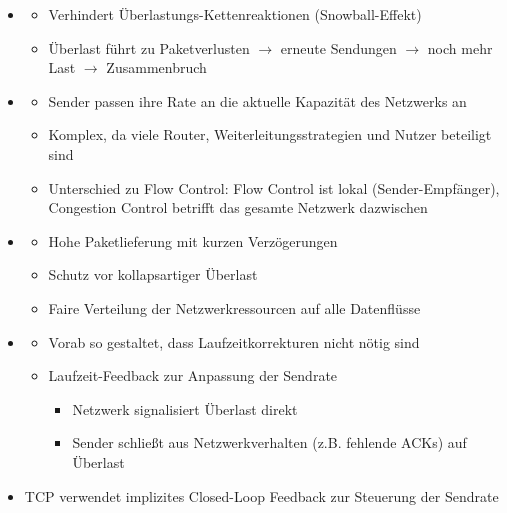 \begin{itemize}
    \item {}
    \begin{itemize}
        \item Verhindert Überlastungs-Kettenreaktionen (Snowball-Effekt)
        \item Überlast führt zu Paketverlusten $\rightarrow$ erneute Sendungen $\rightarrow$ noch mehr Last $\rightarrow$ Zusammenbruch
    \end{itemize}
    \item {}
    \begin{itemize}
        \item Sender passen ihre Rate an die aktuelle Kapazität des Netzwerks an
        \item Komplex, da viele Router, Weiterleitungsstrategien und Nutzer beteiligt sind
        \item Unterschied zu Flow Control: Flow Control ist lokal (Sender-Empfänger), Congestion Control betrifft das gesamte Netzwerk dazwischen
    \end{itemize}
    \item {}
    \begin{itemize}
        \item Hohe Paketlieferung mit kurzen Verzögerungen
        \item Schutz vor kollapsartiger Überlast
        \item Faire Verteilung der Netzwerkressourcen auf alle Datenflüsse
    \end{itemize}
    \item {}
    \begin{itemize}
        \item {} Vorab so gestaltet, dass Laufzeitkorrekturen nicht nötig sind
        \item {} Laufzeit-Feedback zur Anpassung der Sendrate
        \begin{itemize}
            \item {} Netzwerk signalisiert Überlast direkt
            \item {} Sender schließt aus Netzwerkverhalten (z.B. fehlende ACKs) auf Überlast
        \end{itemize}
    \end{itemize}
    \item {} TCP verwendet implizites Closed-Loop Feedback zur Steuerung der Sendrate
\end{itemize}
